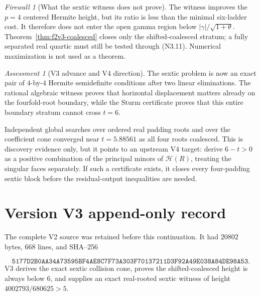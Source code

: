 \documentclass[11pt]{article}
\theoremstyle{definition}
\theoremstyle{remark}
\newtheorem{assessment}[theorem]{Assessment}
\newtheorem{firewall}[theorem]{Firewall}
\begin{document}
\begin{firewall}[What the sextic witness does not prove]
The witness improves the \(p=4\) centered Hermite height, but its ratio is
less than the minimal six-ladder cost.  It therefore does not enter the
open gamma region below
\(|\gamma|/\sqrt{1+\theta}\).  Theorem~\ref{thm:f2v3-coalesced} closes
only the shifted-coalesced stratum; a fully separated real quartic must
still be tested through \textup{(N3.11)}.  Numerical maximization is not
used as a theorem.
\end{firewall}

\begin{assessment}[V3 advance and V4 direction]
The sextic problem is now an exact pair of \(4\)-by-\(4\) Hermite
semidefinite conditions after two linear eliminations.  The rational
algebraic witness proves that horizontal displacement matters already
on the fourfold-root boundary, while the Sturm certificate proves that
this entire boundary stratum cannot cross \(t=6\).

Independent global searches over ordered real padding roots and over the
coefficient cone converged near \(t=5.88561\) as all four roots coalesced.
This is discovery evidence only, but it points to an upstream V4 target:
derive \(6-t>0\) as a positive combination of the principal minors of
\(\mathcal H(R)\), treating the singular faces separately.  If such a
certificate exists, it closes every four-padding sextic block before the
residual-output inequalities are needed.
\end{assessment}

\section*{Version V3 append-only record}
The complete V2 source was retained before this continuation.  It had
\(20802\) bytes, \(668\) lines, and SHA--256

\[
 \texttt{5177D2B0AA34A73595BF4AE8C7F73A303F70137211D3F92A49E038A84DE98A53}.
\]
V3 derives the exact sextic collision cone, proves the shifted-coalesced
height is always below \(6\), and supplies an exact real-rooted sextic
witness of height \(4002793/680625>5\).



\end{document}
